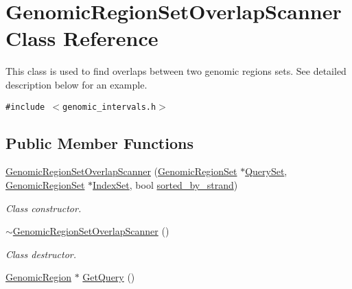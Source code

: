 \hypertarget{classGenomicRegionSetOverlapScanner}{
\section{GenomicRegionSetOverlapScanner Class Reference}
\label{classGenomicRegionSetOverlapScanner}
}
This class is used to find overlaps between two genomic regions sets. See detailed description below for an example.  


{\tt \#include $<$genomic\_\-intervals.h$>$}

\subsection*{Public Member Functions}
\begin{CompactItemize}
\item 
\hyperlink{classGenomicRegionSetOverlapScanner_268a52207c12005452c46e86167e4faf}{GenomicRegionSetOverlapScanner} (\hyperlink{classGenomicRegionSet}{GenomicRegionSet} $\ast$\hyperlink{classGenomicRegionSetOverlapScanner_f74bf7176b25f99da4c38e84f50efb75}{QuerySet}, \hyperlink{classGenomicRegionSet}{GenomicRegionSet} $\ast$\hyperlink{classGenomicRegionSetOverlapScanner_6c9bb71f3f0479b0f773d13315a64162}{IndexSet}, bool \hyperlink{classGenomicRegionSetOverlapScanner_03774130ef410465b36be25ae28682e7}{sorted\_\-by\_\-strand})
\begin{CompactList}\small\item\em Class constructor. \item\end{CompactList}\item 
\hypertarget{classGenomicRegionSetOverlapScanner_5670ab6cb78ef5034d3fd471d000aea0}{
\hyperlink{classGenomicRegionSetOverlapScanner_5670ab6cb78ef5034d3fd471d000aea0}{$\sim$GenomicRegionSetOverlapScanner} ()}
\label{classGenomicRegionSetOverlapScanner_5670ab6cb78ef5034d3fd471d000aea0}

\begin{CompactList}\small\item\em Class destructor. \item\end{CompactList}\item 
\hypertarget{classGenomicRegionSetOverlapScanner_3fdc80b8ce58503fbf56c3408dfe41a5}{
\hyperlink{classGenomicRegion}{GenomicRegion} $\ast$ \hyperlink{classGenomicRegionSetOverlapScanner_3fdc80b8ce58503fbf56c3408dfe41a5}{GetQuery} ()}
\label{classGenomicRegionSetOverlapScanner_3fdc80b8ce58503fbf56c3408dfe41a5}


\end{CompactItemize}
